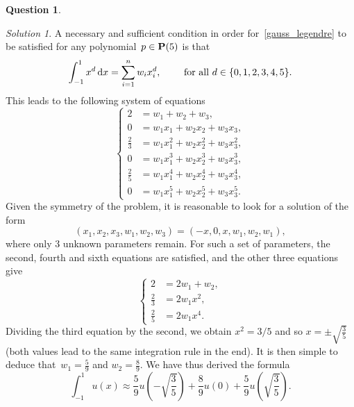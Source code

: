 \documentclass[11pt]{article}
\theoremstyle{definition}
\newtheorem{question}{Question}
\theoremstyle{remark}
\newtheorem*{protosolution}{Solution}
\newenvironment{solutionframe}
{%
    \begin{mdframed}[
        leftmargin=1cm,
        skipabove=.3cm,
        linecolor=blue,
        backgroundcolor=lightgreen,
        linewidth=0pt,
        innerleftmargin=.5em,
        innerrightmargin=.5em,
        innertopmargin=.3em,
        innerbottommargin=.6em,
    ]
}
{
    \end{mdframed}
}
\newenvironment{solution}
{\pushQED{\qed}\renewcommand{\qedsymbol}{$\triangle$}
\begin{solutionframe}\small \begin{protosolution}}
{\popQED\end{protosolution}\end{solutionframe}}
\begin{document}
\begin{question}
\begin{enumerate}
            \begin{solution}
                A necessary and sufficient condition in order for~\eqref{gauss_legendre} to be satisfied for any polynomial~$p \in \mathbf P(5)$ is that
                \[
                    \int_{-1}^{1} x^d \, \mathrm d x= \sum_{i=1}^{n} w_i x_i^d,
                    \qquad \text{ for all $d \in \{0, 1, 2, 3, 4, 5\}$}.
                \]
                This leads to the following system of equations
                \begin{equation*}
                    \left\{
                        \begin{aligned}
                            2 &= w_1 + w_2 + w_3, \\
                            0 &= w_1 x_1 + w_2 x_2 +  w_3 x_3, \\
                            \frac{2}{3} &= w_1 x_1^2 + w_2 x_2^2 +  w_3 x_3^2, \\
                            0 &= w_1 x_1^3 + w_2 x_2^3 +  w_3 x_3^3, \\
                            \frac{2}{5} &= w_1 x_1^4 + w_2 x_2^4 +  w_3 x_3^4, \\
                            0 &= w_1 x_1^5 + w_2 x_2^5 +  w_3 x_3^5.
                        \end{aligned}
                        \right.
                \end{equation*}
                Given the symmetry of the problem,
                it is reasonable to look for a solution of the form
                \[
                    (x_1, x_2, x_3, w_1, w_2, w_3)
                    = (-x, 0, x, w_1, w_2, w_1),
                \]
                where only 3 unknown parameters remain.
                For such a set of parameters,
                the second, fourth and sixth equations are satisfied,
                and the other three equations give
                \begin{equation*}
                    \left\{
                        \begin{aligned}
                            2 &= 2w_1 + w_2, \\
                            \frac{2}{3} &= 2 w_1 x^2, \\
                            \frac{2}{5} &= 2 w_1 x^4.
                        \end{aligned}
                        \right.
                \end{equation*}
                Dividing the third equation by the second,
                we obtain $x^2 = 3/5$ and so $x = \pm \sqrt{\frac{3}{5}}$ (both values lead to the same integration rule in the end).
                It is then simple to deduce that~$w_1 = \frac{5}{9}$ and $w_2 = \frac{8}{9}$.
                We have thus derived the formula
                \[
                    \int_{-1}^{1} u(x) \approx
                    \frac{5}{9} u \left( - \sqrt{\frac{3}{5}} \right)
                    + \frac{8}{9} u \left(0\right)
                    + \frac{5}{9} u \left( \sqrt{\frac{3}{5}} \right).
                \]
            \end{solution}


\end{enumerate}
\end{question}
\end{document}
